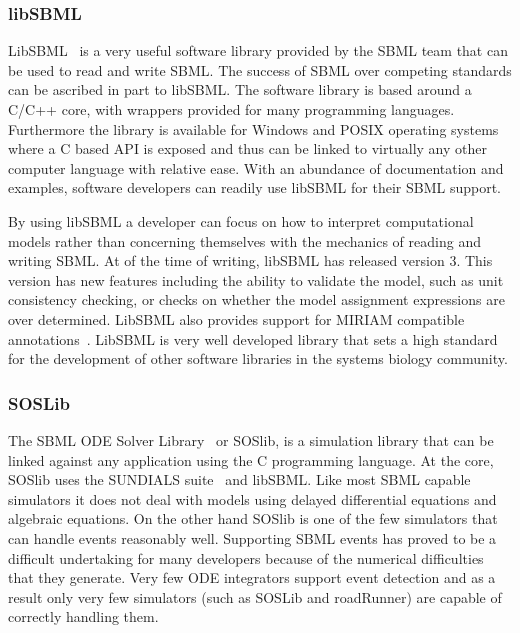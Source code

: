 \documentclass[12pt]{article}
\begin{document}
\subsubsection{libSBML}

LibSBML~\citep{libSBML:2008} is a very useful software library
provided by the SBML team that can be used to read and write SBML.
The success of SBML over competing standards can be ascribed in part
to libSBML. The software library is based around a C/C++ core, with
wrappers provided for many programming languages. Furthermore the
library is available for Windows and POSIX operating systems where a
C based API is exposed and thus can be linked to virtually any other
computer language with relative ease. With an abundance of
documentation and examples, software developers can readily use
libSBML for their SBML support.

By using libSBML a developer can focus on how to interpret
computational models rather than concerning themselves with the
mechanics of reading and writing SBML. At of the time of writing,
libSBML has released version 3. This version has new features
including the ability to validate the model, such as unit
consistency checking, or checks on whether the model assignment
expressions are over determined. LibSBML also provides support for
MIRIAM compatible annotations~\citep{miriam}. LibSBML is very well
developed library that sets a high standard for the development of
other software libraries in the systems biology community.


\subsubsection{SOSLib}

The SBML ODE Solver Library~\citep{Machne:2006} or SOSlib, is a
simulation library that can be linked against any application using
the C programming language. At the core, SOSlib uses the SUNDIALS
suite~\citep{CVODE:2005} and libSBML. Like most SBML capable
simulators it does not deal with models using delayed differential
equations and algebraic equations. On the other hand SOSlib is one
of the few simulators that can handle events reasonably well.
Supporting SBML events has proved to be a difficult undertaking for
many developers because of the numerical difficulties that they
generate. Very few ODE integrators support event detection and as a
result only very few simulators (such as SOSLib and roadRunner) are
capable of correctly handling them.
\end{document}
